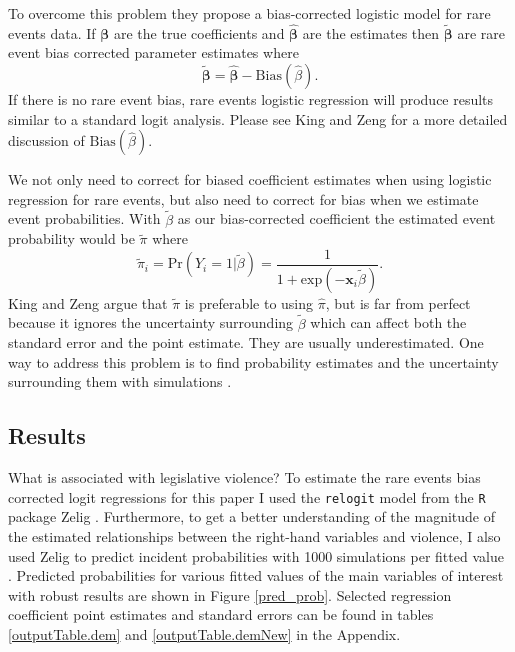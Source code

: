 \documentclass[a4paper]{article}\usepackage{graphicx, color}
\begin{document}
{{To overcome this problem they propose a bias-corrected logistic model for rare events data. If $\mathbf{\beta}$ are the true coefficients and $\mathbf{\hat\beta}$ are the estimates then $\mathbf{\tilde\beta}$ are rare event bias corrected parameter estimates where 
%
\begin{equation}
    \mathbf{\tilde\beta} = \mathbf{\hat\beta} - \mathrm{Bias}(\hat\beta). 
\end{equation}
%
If there is no rare event bias, rare events logistic regression will produce results similar to a standard logit analysis. Please see King and Zeng \citep[147--148]{KingRareEventsPA2001} for a more detailed discussion of $\mathrm{Bias}(\hat\beta)$.

We not only need to correct for biased coefficient estimates when using logistic regression for rare events, but also need to correct for bias when we estimate event probabilities. With $\tilde\beta$ as our bias-corrected coefficient the estimated event probability would be $\tilde\pi$ where
%
\begin{equation}
    \tilde\pi_{i} = \mathrm{Pr}(Y_{i} = 1 | \tilde\beta) = \frac{1}{1 + \mathrm{exp}(-\mathbf{x}_{i} \tilde\beta)}.
\end{equation}
% 
King and Zeng \citeyearpar[148--150]{KingRareEventsPA2001} argue that $\tilde\pi$ is preferable to using $\hat\pi$, but is far from perfect because it ignores the uncertainty surrounding $\tilde\beta$ which can affect both the standard error and the point estimate. They are usually underestimated. One way to address this problem is to find probability estimates and the uncertainty surrounding them with simulations \citep[see][]{King2000}.



\subsection{Results}

What is associated with legislative violence? To estimate the rare events bias corrected logit regressions for this paper I used the {\tt{relogit}} model from the {\tt{R}} package Zelig \citep{IMAIKingZelig2008}. Furthermore, to get a better understanding of the magnitude of the estimated relationships between the right-hand variables and violence, I also used Zelig to predict incident probabilities with 1000 simulations per fitted value \citep[see][]{King2002}. Predicted probabilities for various fitted values of the main variables of interest with robust results are shown in Figure \ref{pred_prob}. Selected regression coefficient point estimates and standard errors can be found in tables \ref{outputTable.dem} and \ref{outputTable.demNew} in the Appendix. 

}}
\end{document}
